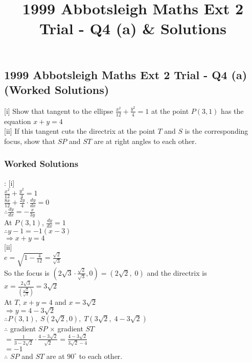\documentclass[10pt,a4paper]{report}
\title{1999 Abbotsleigh Maths Ext 2 Trial - Q4 (a) & Solutions}
\theoremstyle{thm}
\begin{document}
\subsection*{1999 Abbotsleigh Maths Ext 2 Trial - Q4 (a) (Worked Solutions)}
[i] Show that tangent to the ellipse $\displaystyle\frac{{{x^2}}}{{12}} + 
\frac{{{y^2}}}{4} = 1$ at the point $P\left( {3,1} \right)$ has the equation $x 
+ y = 4$\\[1em]
[ii] If this tangent cuts the directrix at the point $T$ and $S$ is the 
corresponding focus, show that $SP$ and $ST$ are at right angles to each 
other.\\
\subsubsection{Worked Solutions}:
[i]\\
$\displaystyle \frac{x^2}{12} + \frac{y^2}{4} = 1$\\
$\displaystyle \frac{8x}{12} + \frac{2y}{4} \cdot \frac{dy}{dx} = 0$\\
$\therefore \displaystyle \frac{dy}{dx} =  - \frac{x}{3y}$\\[1em]
At $P\left(3,1\right)$, $\displaystyle \frac{dy}{dx} =  1$\\
$\therefore y - 1 =  - 1\left(x - 3\right)$\\
$ \Rightarrow x + y = 4$\\[1em]
[ii]\\
$e = \sqrt {1 - \displaystyle\frac{4}{12}}  = \frac{\sqrt 2 }{\sqrt 3 }$\\
So the focus is $\left(2\sqrt 3  \cdot \displaystyle\frac{\sqrt 2 }{\sqrt 3 },0 \right) = \left(2\sqrt 2 ,\;0 \right)$ and the directrix is $x = \frac{2\sqrt 3 }{\left( \displaystyle\frac{\sqrt 2 }{\sqrt 3 } \right)} = 3\sqrt 2 $\\[1em]
At $T$, $x + y = 4$ and $x = 3\sqrt 2 $\\
$ \Rightarrow y = 4 - 3\sqrt 2 $\\
$\therefore P\left( {3,1} \right),\;S\left(2\sqrt 2 ,0 \right),\;T\left(3\sqrt 2 ,\;4 - 3\sqrt 2 \right)$\\[1em]
$\therefore $ gradient $SP$ $ \times $ gradient $ST$\\
$ = \displaystyle\frac{1}{3 - 2\sqrt 2 } \cdot \frac{4 - 3\sqrt 2 }{\sqrt 2 } = \frac{4 - 3\sqrt 2 }{3\sqrt 2  - 4}$\\
$ =  - 1$\\[1em]
$\therefore $ $SP$ and $ST$ are at $90^\circ $ to each other.\\
\end{document}
